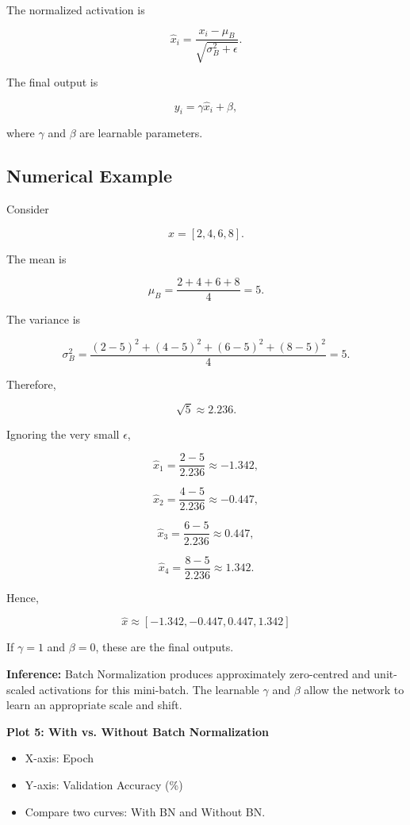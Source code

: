 \documentclass[10pt]{article}
\begin{document}
The normalized activation is

\[
\hat{x}_i=
\frac{x_i-\mu_B}
{\sqrt{\sigma_B^2+\epsilon}}.
\]

The final output is

\[
y_i=\gamma\hat{x}_i+\beta,
\]

where $\gamma$ and $\beta$ are learnable parameters.

\subsection*{Numerical Example}

Consider

\[
x=[2,4,6,8].
\]

The mean is

\[
\mu_B=\frac{2+4+6+8}{4}=5.
\]

The variance is

\[
\sigma_B^2=
\frac{(2-5)^2+(4-5)^2+(6-5)^2+(8-5)^2}{4}
=5.
\]

Therefore,

\[
\sqrt{5}\approx2.236.
\]

Ignoring the very small $\epsilon$,

\[
\hat{x}_1=\frac{2-5}{2.236}\approx-1.342,
\]

\[
\hat{x}_2=\frac{4-5}{2.236}\approx-0.447,
\]

\[
\hat{x}_3=\frac{6-5}{2.236}\approx0.447,
\]

\[
\hat{x}_4=\frac{8-5}{2.236}\approx1.342.
\]

Hence,

\[
\boxed{
\hat{x}\approx[-1.342,-0.447,0.447,1.342]
}
\]

If $\gamma=1$ and $\beta=0$, these are the final outputs.

\textbf{Inference:} Batch Normalization produces approximately
zero-centred and unit-scaled activations for this mini-batch. The
learnable $\gamma$ and $\beta$ allow the network to learn an appropriate
scale and shift.

\textbf{Plot 5: With vs. Without Batch Normalization}

\begin{itemize}
\item X-axis: Epoch
\item Y-axis: Validation Accuracy (\%)
\item Compare two curves: With BN and Without BN.
\end{itemize}

\end{document}
